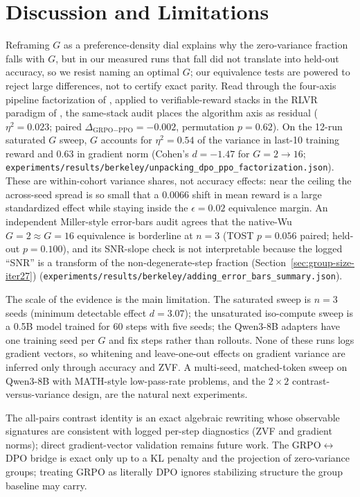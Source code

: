 \section{Discussion and Limitations}
\label{sec:p3-discussion}
Reframing $G$ as a preference-density dial explains why the zero-variance fraction
falls with $G$, but in our measured runs that fall did not translate into held-out
accuracy, so we resist naming an optimal $G$; our equivalence tests are powered to
reject large differences, not to certify exact parity. Read through the four-axis
pipeline factorization of \citet{ivison2024unpacking}, applied to verifiable-reward
stacks in the RLVR paradigm of \citet{lambert2024tulu3}, the same-stack audit
places the algorithm axis as residual ($\eta^2{=}0.023$; paired
$\Delta_{\text{GRPO}-\text{PPO}}{=}-0.002$, permutation $p{=}0.62$). On the 12-run
saturated $G$ sweep, $G$ accounts for $\eta^2{=}0.54$ of the variance in last-10
training reward and $0.63$ in gradient norm (Cohen's $d{=}-1.47$ for $G{=}2{\to}16$;
\texttt{experiments/results/berkeley/unpacking\_dpo\_ppo\_factorization.json}).
These are within-cohort variance shares, not accuracy effects: near the ceiling
the across-seed spread is so small that a $0.0066$ shift in mean reward is a large
standardized effect while staying inside the $\epsilon{=}0.02$ equivalence margin.
An independent Miller-style error-bars audit \citep{miller2024erroreval} agrees that
the native-Wu $G{=}2\approx G{=}16$ equivalence is borderline at $n{=}3$ (TOST
$p{=}0.056$ paired; held-out $p{=}0.100$), and its SNR-slope check is not
interpretable because the logged ``SNR'' is a transform of the
non-degenerate-step fraction (Section~\ref{sec:group-size-iter27})
(\texttt{experiments/results/berkeley/adding\_error\_bars\_summary.json}).

The scale of the evidence is the main limitation. The saturated sweep is $n{=}3$
seeds (minimum detectable effect $d{=}3.07$); the unsaturated iso-compute sweep is
a 0.5B model trained for $60$ steps with five seeds; the Qwen3-8B adapters have one
training seed per $G$ and fix steps rather than rollouts. None of these runs logs
gradient vectors, so whitening and leave-one-out effects on gradient variance are
inferred only through accuracy and ZVF. A multi-seed, matched-token sweep on
Qwen3-8B with MATH-style low-pass-rate problems, and the $2{\times}2$
contrast-versus-variance design, are the natural next experiments.

The all-pairs contrast identity is an exact algebraic rewriting whose observable
signatures are consistent with logged per-step diagnostics (ZVF and gradient
norms); direct gradient-vector validation remains future work. The
GRPO$\leftrightarrow$DPO bridge is exact only up to a KL penalty and the
projection of zero-variance groups; treating GRPO as literally DPO ignores
stabilizing structure the group baseline may carry.

